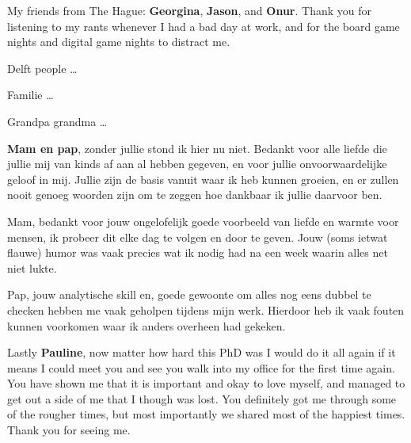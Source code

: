 My friends from The Hague: \textbf{Georgina}, \textbf{Jason}, and \textbf{Onur}.
Thank you for listening to my rants whenever I had a bad day at work, and for the board game nights and digital game nights to distract me.

Delft people \dots

Familie \dots

Grandpa grandma \dots

\textbf{Mam en pap}, zonder jullie stond ik hier nu niet.
Bedankt voor alle liefde die jullie mij van kinds af aan al hebben gegeven, en voor jullie onvoorwaardelijke geloof in mij.
Jullie zijn de basis vanuit waar ik heb kunnen groeien, en er zullen nooit genoeg woorden zijn om te zeggen hoe dankbaar ik jullie daarvoor ben.

Mam, bedankt voor jouw ongelofelijk goede voorbeeld van liefde en warmte voor mensen, ik probeer dit elke dag te volgen en door te geven.
Jouw (soms ietwat flauwe) humor was vaak precies wat ik nodig had na een week waarin alles net niet lukte.

Pap, jouw analytische skill en, goede gewoonte om alles nog eens dubbel te checken hebben me vaak geholpen tijdens mijn werk.
Hierdoor heb ik vaak fouten kunnen voorkomen waar ik anders overheen had gekeken.

Lastly \textbf{Pauline}, now matter how hard this PhD was I would do it all again if it means I could meet you and see you walk into my office for the first time again.
You have shown me that it is important and okay to love myself, and managed to get out a side of me that I though was lost.
You definitely got me through some of the rougher times, but most importantly we shared most of the happiest times.
Thank you for seeing me.
